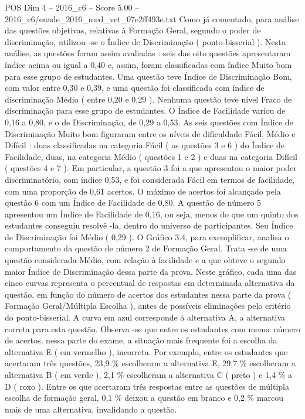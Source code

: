 \begin{textsample}{POS Dim 4 – 2016\_c6 – Score 5.00 – 2016\_c6/enade\_2016\_med\_vet\_07e2ff493e.txt}
Como já comentado, para análise das questões objetivas, relativas à Formação Geral, segundo o poder de discriminação, utilizou -se o Índice de Discriminação ( ponto-bisserial ).
Nesta análise, as questões foram assim avaliadas : seis das oito questões apresentaram índice acima ou igual a 0,40 e, assim, foram classificadas com índice Muito bom para esse grupo de estudantes.
Uma questão teve Índice de Discriminação Bom, com valor entre 0,30 e 0,39, e uma questão foi classificada com índice de discriminação Médio ( entre 0,20 e 0,29 ).
Nenhuma questão teve nível Fraco de discriminação para esse grupo de estudantes.
O Índice de Facilidade variou de 0,16 a 0,80, e o de Discriminação, de 0,29 a 0,53.
As seis questões com Índice de Discriminação Muito bom figuraram entre os níveis de dificuldade Fácil, Médio e Difícil : duas classificadas na categoria Fácil ( as questões 3 e 6 ) do Índice de Facilidade, duas, na categoria Médio ( questões 1 e 2 ) e duas na categoria Difícil ( questões 4 e 7 ).
Em particular, a questão 3 foi a que apresentou o maior poder discriminatório, com índice 0,53, e foi considerada Fácil em termos de facilidade, com uma proporção de 0,61 acertos.
O máximo de acertos foi alcançado pela questão 6 com um Índice de Facilidade de 0,80.
A questão de número 5 apresentou um Índice de Facilidade de 0,16, ou seja, menos do que um quinto dos estudantes conseguiu resolvê -la, dentro do universo de participantes.
Seu Índice de Discriminação foi Médio ( 0,29 ).
O Gráfico 3.4, para exemplificar, analisa o comportamento da questão de número 2 de Formação Geral.
Trata -se de uma questão considerada Médio, com relação à facilidade e a que obteve o segundo maior Índice de Discriminação dessa parte da prova.
Neste gráfico, cada uma das cinco curvas representa o percentual de respostas em determinada alternativa da questão, em função do número de acertos dos estudantes nessa parte da prova ( Formação Geral/Múltipla Escolha ), antes de possíveis eliminações pelo critério do ponto-bisserial.
A curva em azul corresponde à alternativa A, a alternativa correta para esta questão.
Observa -se que entre os estudantes com menor número de acertos, nessa parte do exame, a situação mais frequente foi a escolha da alternativa E ( em vermelho ), incorreta.
Por exemplo, entre os estudantes que acertaram três questões, 23,9 \% escolheram a alternativa E, 29,7 \% escolheram a alternativa B ( em verde ), 2,1 \% escolheram a alternativa C ( preto ) e 1,4 \% a D ( roxo ).
Entre os que acertaram três respostas entre as questões de múltipla escolha de formação geral, 0,1 \% deixou a questão em branco e 0,2 \% marcou mais de uma alternativa, invalidando a questão.

\end{textsample}
